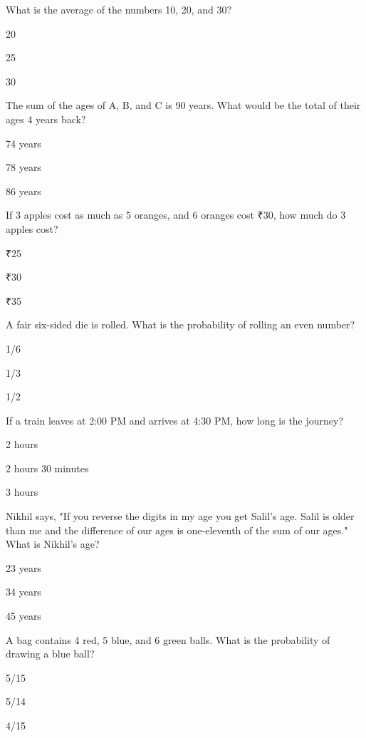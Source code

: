 \begin{enhancedmcq}{What is the average of the numbers 10, 20, and 30?}
\item 20
\item 25
\item 30

\end{enhancedmcq}
\begin{enhancedmcq}{The sum of the ages of A, B, and C is 90 years. What would be the total of their ages 4 years back?}
\item 74 years
\item 78 years
\item 86 years

\end{enhancedmcq}
\begin{enhancedmcq}{If 3 apples cost as much as 5 oranges, and 6 oranges cost ₹30, how much do 3 apples cost?}
\item ₹25
\item ₹30
\item ₹35

\end{enhancedmcq}
\begin{enhancedmcq}{A fair six-sided die is rolled. What is the probability of rolling an even number?}
\item 1/6
\item 1/3
\item 1/2

\end{enhancedmcq}
\begin{enhancedmcq}{If a train leaves at 2:00 PM and arrives at 4:30 PM, how long is the journey?}
\item 2 hours
\item 2 hours 30 minutes
\item 3 hours

\end{enhancedmcq}
\begin{enhancedmcq}{Nikhil says, "If you reverse the digits in my age you get Salil's age. Salil is older than me and the difference of our ages is one-eleventh of the sum of our ages." What is Nikhil's age?}
\item 23 years
\item 34 years
\item 45 years

\end{enhancedmcq}
\begin{enhancedmcq}{A bag contains 4 red, 5 blue, and 6 green balls. What is the probability of drawing a blue ball?}
\item 5/15
\item 5/14
\item 4/15

\end{enhancedmcq}

